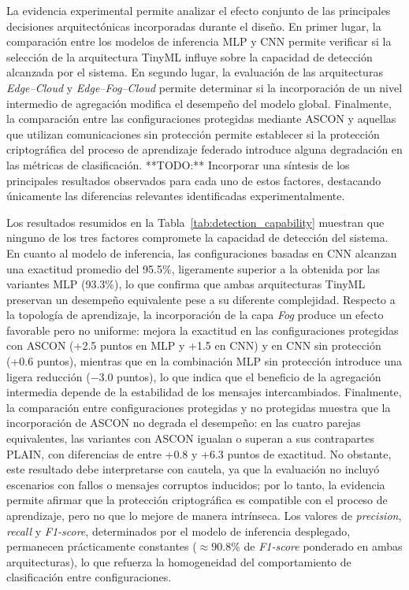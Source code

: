 \documentclass[journal,article,submit,moreauthors]{Definitions/mdpi}
\begin{document}
La evidencia experimental permite analizar el efecto conjunto de las principales decisiones arquitectónicas incorporadas durante el diseño. En primer lugar, la comparación entre los modelos de inferencia MLP y CNN permite verificar si la selección de la arquitectura TinyML influye sobre la capacidad de detección alcanzada por el sistema. En segundo lugar, la evaluación de las arquitecturas \textit{Edge--Cloud} y \textit{Edge--Fog--Cloud} permite determinar si la incorporación de un nivel intermedio de agregación modifica el desempeño del modelo global. Finalmente, la comparación entre las configuraciones protegidas mediante ASCON y aquellas que utilizan comunicaciones sin protección permite establecer si la protección criptográfica del proceso de aprendizaje federado introduce alguna degradación en las métricas de clasificación. **TODO:** Incorporar una síntesis de los principales resultados observados para cada uno de estos factores, destacando únicamente las diferencias relevantes identificadas experimentalmente.

Los resultados resumidos en la Tabla~\ref{tab:detection_capability} muestran que ninguno de los tres factores compromete la capacidad de detección del sistema. En cuanto al modelo de inferencia, las configuraciones basadas en CNN alcanzan una exactitud promedio del 95.5\%, ligeramente superior a la obtenida por las variantes MLP (93.3\%), lo que confirma que ambas arquitecturas TinyML preservan un desempeño equivalente pese a su diferente complejidad. Respecto a la topología de aprendizaje, la incorporación de la capa \textit{Fog} produce un efecto favorable pero no uniforme: mejora la exactitud en las configuraciones protegidas con ASCON (+2.5 puntos en MLP y +1.5 en CNN) y en CNN sin protección (+0.6 puntos), mientras que en la combinación MLP sin protección introduce una ligera reducción (\(-3.0\) puntos), lo que indica que el beneficio de la agregación intermedia depende de la estabilidad de los mensajes intercambiados. Finalmente, la comparación entre configuraciones protegidas y no protegidas muestra que la incorporación de ASCON no degrada el desempeño: en las cuatro parejas equivalentes, las variantes con ASCON igualan o superan a sus contrapartes PLAIN, con diferencias de entre +0.8 y +6.3 puntos de exactitud. No obstante, este resultado debe interpretarse con cautela, ya que la evaluación no incluyó escenarios con fallos o mensajes corruptos inducidos; por lo tanto, la evidencia permite afirmar que la protección criptográfica es compatible con el proceso de aprendizaje, pero no que lo mejore de manera intrínseca. Los valores de \textit{precision}, \textit{recall} y \textit{F1-score}, determinados por el modelo de inferencia desplegado, permanecen prácticamente constantes (\(\approx\)90.8\% de \textit{F1-score} ponderado en ambas arquitecturas), lo que refuerza la homogeneidad del comportamiento de clasificación entre configuraciones.
\end{document}
